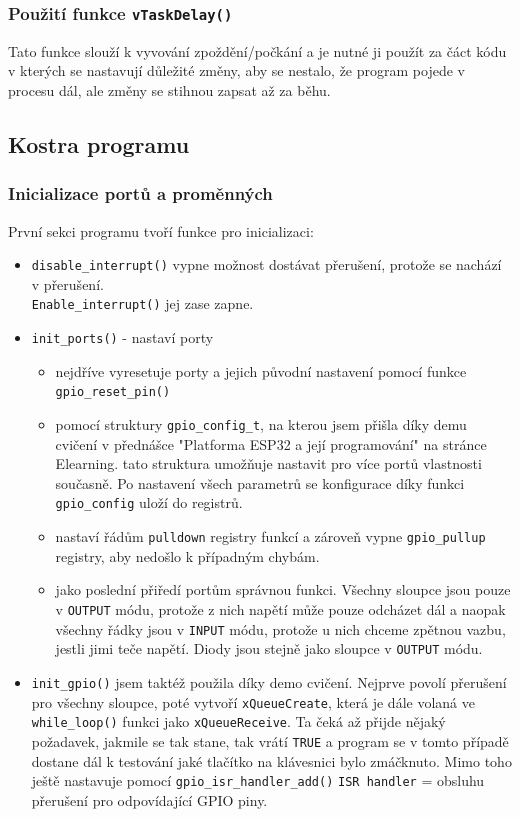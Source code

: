 \documentclass[a4paper, 11pt]{article}
\begin{document}
\subsubsection{Použití funkce \texttt{vTaskDelay()}}
Tato funkce slouží k vyvování zpoždění/počkání a je nutné ji použít za čáct kódu v kterých se nastavují důležité změny, aby se nestalo, že program pojede v procesu dál, ale změny se stihnou zapsat až za běhu.

\subsection{Kostra programu}
\subsubsection{Inicializace portů a proměnných}
První sekci programu tvoří funkce pro inicializaci:
\begin{itemize}
    \item \verb!disable_interrupt()! vypne možnost dostávat přerušení, protože se nachází v přerušení.\\ \verb!Enable_interrupt()! jej zase zapne.
    \item \verb!init_ports()! - nastaví porty 
    \begin{itemize}
        \item nejdříve vyresetuje porty a jejich původní nastavení pomocí funkce \verb!gpio_reset_pin()!
        \item pomocí struktury \verb!gpio_config_t!, na kterou jsem přišla díky demu cvičení v přednášce "Platforma ESP32 a její programování" na stránce Elearning. tato struktura umožňuje nastavit pro více portů vlastnosti současně. Po nastavení všech parametrů se konfigurace díky funkci \verb!gpio_config! uloží do registrů.
        \item nastaví řádům \verb!pulldown! registry funkcí a zároveň vypne \verb!gpio_pullup! registry, aby nedošlo k případným chybám.
        \item jako poslední přiředí portům správnou funkci. Všechny sloupce jsou pouze v \verb!OUTPUT! módu, protože z nich napětí může pouze odcházet dál a naopak všechny řádky jsou v \verb!INPUT! módu, protože u nich chceme zpětnou vazbu, jestli jimi teče napětí. Diody jsou stejně jako sloupce v \verb!OUTPUT! módu.
    \end{itemize}
    \item \verb!init_gpio()! jsem taktéž použila díky demo cvičení. Nejprve povolí přerušení pro všechny sloupce, poté vytvoří \verb!xQueueCreate!, která je dále volaná ve \verb!while_loop()! funkci jako \verb!xQueueReceive!. Ta čeká až přijde nějaký požadavek, jakmile se tak stane, tak vrátí \verb!TRUE! a program se v tomto případě dostane dál k testování jaké tlačítko na klávesnici bylo zmáčknuto. Mimo toho ještě nastavuje pomocí \verb!gpio_isr_handler_add()! \verb!ISR handler! = obsluhu přerušení pro odpovídající GPIO piny.
\end{itemize}
\end{document}
